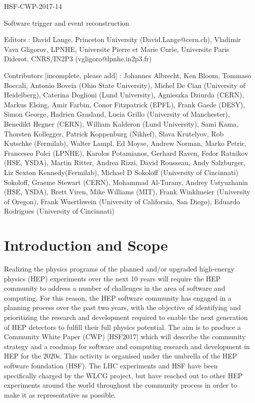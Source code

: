 HSF-CWP-2017-14

Software trigger and event reconstruction

Editors : David Lange, Princeton University (David.Lange@cern.ch), Vladimir Vava Gligorov, LPNHE, Universite Pierre et Marie Curie, Universite Paris Diderot, CNRS/IN2P3 (vgligoro@lpnhe.in2p3.fr) 

Contributors [incomplete, please add] : Johannes Albrecht, Ken Bloom, Tommaso Boccali, Antonio Boveia (Ohio State University), Michel De Cian (University of Heidelberg), Caterina Doglioni (Lund University), Agnieszka Dziurda (CERN), Markus Elsing, Amir Farbin, Conor Fitzpatrick (EPFL), Frank Gaede (DESY), Simon George, Hadrien Grasland, Lucia Grillo (University of Manchester), Benedikt Hegner (CERN), William Kalderon (Lund University), Sami Kama, Thorsten Kollegger, Patrick Koppenburg (Nikhef), Slava Krutelyov, Rob Kutschke (Fermilab), Walter Lampl, Ed Moyse, Andrew Norman, Marko Petric, Francesco Polci (LPNHE), Karolos Potamianos, Gerhard Raven, Fedor Ratnikov (HSE, YSDA), Martin Ritter,  Andrea Rizzi, David Rousseau, Andy Salzburger, Liz Sexton Kennedy(Fermilab), Michael D Sokoloff (University of Cincinnati) Sokoloff, Graeme Stewart (CERN), Mohammad Al-Turany,  Andrey Ustyuzhanin (HSE, YSDA), Brett Viren, Mike Williams (MIT), Frank Winklmeier (University of Oregon), Frank Wuerthwein (University of California, San Diego), Eduardo Rodrigues (University of Cincinnati)


\section{Introduction and Scope}

Realizing the physics programs of the planned and/or upgraded high-energy physics (HEP) experiments over the next 10 years will require the HEP community to address a number of challenges in the area of software and computing. For this reason, the HEP software community has engaged in a planning process over the past two years, with the objective of identifying and prioritizing the research and development required to enable the next generation of HEP detectors to fulfill their full physics potential. The aim is to produce a Community White Paper (CWP) [HSF2017] which will describe the community strategy and a roadmap for software and computing research and development in HEP for the 2020s. This activity is organised under the umbrella of the HEP software foundation (HSF). The LHC experiments and HSF have been specifically charged by the WLCG project, but have reached out to other HEP experiments around the world throughout the community process in order to make it as representative as possible.

